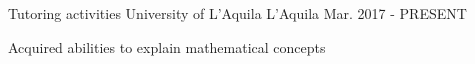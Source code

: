 


\begin{cventries}


\cventry
{Tutoring activities} %
{University of L'Aquila} %
{L'Aquila} %
{Mar. 2017 - PRESENT} %
{ %
\begin{cvitems}
\item {Acquired abilities to explain mathematical concepts}
\end{cvitems}
}




\end{cventries}